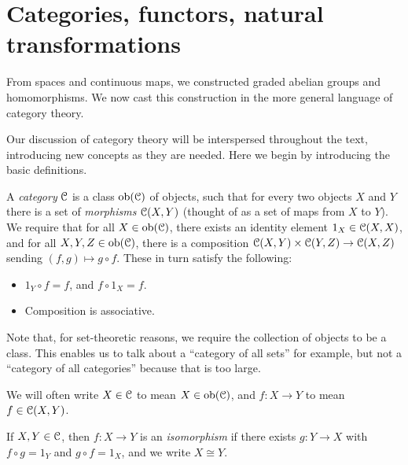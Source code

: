 \section{Categories, functors, natural transformations}
From spaces and continuous maps, we constructed graded abelian groups and homomorphisms. We now cast this construction in the more general language of category theory.

Our discussion of category theory will be interspersed throughout the text, introducing new concepts as they are needed. Here we begin by introducing the basic definitions.

\begin{definition}
A \emph{category} $\mathcal C$ is a class $\mathrm{ob}(\mathcal C)$ of objects, such that for every two objects $X$ and $Y$ there is a set of \emph{morphisms} $\mathcal C(X,Y)$ (thought of as a set of maps from $X$ to $Y$). We require that for all $X\in\mathrm{ob}(\mathcal C)$, there exists an identity element $1_X\in\mathcal C(X,X)$, and for all $X,Y,Z\in\mathrm{ob}(\mathcal C)$, there is a composition $\mathcal C(X,Y)\times\mathcal C(Y,Z)\to\mathcal C(X,Z)$ sending $(f,g)\mapsto g \circ f$. These in turn satisfy the following:
\begin{itemize}
\item $1_Y\circ f=f$, and $f\circ 1_X=f$.
\item Composition is associative.
\end{itemize}
\end{definition}
Note that, for set-theoretic reasons, we require the collection of objects to be a class. This enables us to talk about a ``category of all sets'' for example, but not a ``category of all categories'' because that is too large.

We will often write $X\in\mathcal C$ to mean $X\in\mathrm{ob}(\mathcal C)$, and $f\colon X\to Y$ to mean $f\in \mathcal C(X,Y)$.
\begin{definition}
If $X,Y\in \mathcal C$, then $f\colon X\to Y$ is an \emph{isomorphism} if there exists $g\colon Y\to X$ with $f \circ g=1_Y$ and $g\circ f=1_X$, and we write $X\cong Y$. 
\end{definition}

